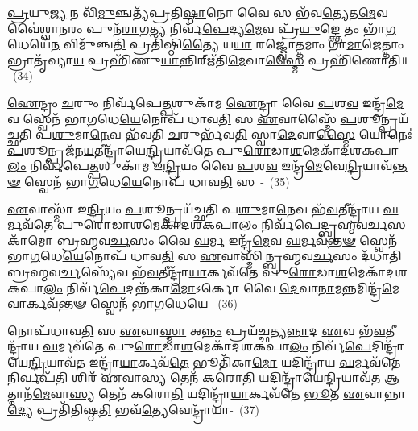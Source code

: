 \-\ul{𑌪𑍍𑌰}\-𑌯𑍁\-\ul{𑌜𑍍𑌯} 𑌨 𑌵𑌿᳴\-\ul{𑌮𑍁}\-𑌞𑍍𑌚𑌤𑍍𑌯᳴𑌪𑍍𑌰𑌤𑌿\-\ul{𑌷𑍍𑌠𑌾}\-𑌨𑍋 𑌵𑍈 𑌸 𑌭᳴𑌵\-\ul{𑌤𑍍𑌯𑍇}\-𑌤\-\ul{𑌮𑍇}\-𑌵 𑌵𑍈॑𑌶𑍍𑌵𑌾\-\ul{𑌨}\-𑌰𑌂 𑌪𑍁𑌨᳴\-\ul{𑌰𑌾}\-𑌗\-\ul{𑌤𑍍𑌯} 𑌨𑌿𑌰𑍍𑌵᳴\-\ul{𑌪𑍇}\-𑌦𑍍𑌯\-\ul{𑌮𑍇}\-𑌵 𑌪𑍍𑌰᳴\-\ul{𑌯𑍁}\-𑌙𑍍𑌕𑍍𑌤𑍇 𑌤𑌂 𑌭𑌾᳴\-\ul{𑌗}\-𑌧𑍇𑌯𑍇᳴\-\ul{𑌨} 𑌵𑌿𑌮𑍁᳴𑌞𑍍𑌚\-\ul{𑌤𑌿} 𑌪𑍍𑌰𑌤𑌿᳴𑌷𑍍𑌠𑌿\-\ul{𑌤𑍍𑌯𑍈} 𑌯\-\ul{𑌯𑌾} 𑌰𑌜𑍍𑌜𑍍𑌵𑍋॑\-\ul{𑌤𑍍𑌤}\-𑌮𑌾𑌂 𑌗𑌾\-\ul{𑌮𑌾}\-𑌜𑍇𑌤𑍍𑌤𑌾𑌂 𑌭𑍍𑌰𑌾𑌤𑍃᳴𑌵𑍍𑌯𑌾\-\ul{𑌯} 𑌪𑍍𑌰𑌹𑌿᳴𑌣𑍁\-\ul{𑌯𑌾}\-𑌨𑍍𑌨𑌿𑌰𑍍\mbox{}𑌋᳴𑌤𑌿\-\ul{𑌮𑍇}\-𑌵𑌾\-\ul{𑌸𑍍𑌮𑍈} 𑌪𑍍𑌰𑌹𑌿᳴𑌣𑍋𑌤𑌿॥~(34)

{\anuvakamend[{\-\ul{𑌨𑌿}\-\-\ul{𑌰𑍍𑌵}\-\-\ul{𑌰𑍁}\-𑌣𑌂 𑌵᳴𑌪𑍇𑌦𑍁\-\ul{𑌭}\-𑌯𑌾\-\ul{𑌦}\-𑌦𑍍𑌯𑍋 𑌵𑍈 𑌸𑌂᳴𑌵\-\ul{𑌥𑍍𑌸}\-𑌰𑍞 𑌷𑌟𑍍𑌤𑍍𑌰𑌿𑍞᳴𑌶𑌚𑍍𑌚।}]}

\-\ul{𑌐}\-𑌨𑍍𑌦𑍍𑌰𑌂 \ul{𑌚}\-𑌰𑍁𑌂 𑌨𑌿𑌰𑍍𑌵᳴𑌪𑍇\-\ul{𑌤𑍍𑌪}\-𑌶𑍁𑌕𑌾᳴𑌮 \ul{𑌐}\-𑌨𑍍𑌦𑍍𑌰𑌾 𑌵𑍈 \ul{𑌪}\-𑌶\-\ul{𑌵} 𑌇𑌨𑍍𑌦𑍍𑌰᳴\-\ul{𑌮𑍇}\-𑌵 𑌸𑍍𑌵𑍇𑌨᳴ 𑌭𑌾\-\ul{𑌗}\-𑌧𑍇\-\ul{𑌯𑍇}\-𑌨𑍋𑌪᳴ 𑌧𑌾𑌵\-\ul{𑌤𑌿} 𑌸 \ul{𑌏}\-𑌵𑌾𑌸𑍍𑌮𑍈᳴ \ul{𑌪}\-𑌶𑍂𑌨𑍍𑌪𑍍𑌰𑌯᳴𑌚𑍍𑌛𑌤𑌿 𑌪\-\ul{𑌶𑍁}\-𑌮𑌾\-\ul{𑌨𑍇}\-𑌵 𑌭᳴𑌵𑌤𑌿 \ul{𑌚}\-𑌰𑍁𑌰𑍍𑌭᳴𑌵\-\ul{𑌤𑌿} 𑌸𑍍𑌵𑌾\-\ul{𑌦𑍇}\-𑌵𑌾\-\ul{𑌸𑍍𑌮𑍈} 𑌯𑍋𑌨𑍇𑌃॑ \ul{𑌪}\-𑌶𑍂𑌨𑍍𑌪𑍍𑌰𑌜᳴𑌨\-\ul{𑌯}\-𑌤𑍀𑌨𑍍𑌦𑍍𑌰𑌾᳴𑌯𑍇\-\ul{𑌨𑍍𑌦𑍍𑌰𑌿}\-𑌯𑌾𑌵᳴𑌤𑍇 𑌪𑍁\-\ul{𑌰𑍋}\-𑌡𑌾\-\ul{𑌶}\-𑌮𑍇𑌕𑌾᳴\-𑌦𑌶\-𑌕𑌪𑌾\-\ul{𑌲𑌂} 𑌨𑌿𑌰𑍍𑌵᳴𑌪𑍇\-\ul{𑌤𑍍𑌪}\-𑌶𑍁𑌕𑌾᳴𑌮 𑌇\-\ul{𑌨𑍍𑌦𑍍𑌰𑌿}\-𑌯𑌂 𑌵𑍈 \ul{𑌪}\-𑌶\-\ul{𑌵} 𑌇𑌨𑍍𑌦𑍍𑌰᳴\-\ul{𑌮𑍇}\-𑌵𑍇\-\ul{𑌨𑍍𑌦𑍍𑌰𑌿}\-𑌯𑌾𑌵᳴\-\ul{𑌨𑍍𑌤}\-\-\ul{𑍟} 𑌸𑍍𑌵𑍇𑌨᳴ 𑌭𑌾\-\ul{𑌗}\-𑌧𑍇\-\ul{𑌯𑍇}\-𑌨𑍋𑌪᳴ 𑌧𑌾𑌵\-\ul{𑌤𑌿} 𑌸~-~(35)

\-\ul{𑌏}\-𑌵𑌾𑌸𑍍𑌮𑌾᳴ 𑌇\-\ul{𑌨𑍍𑌦𑍍𑌰𑌿}\-𑌯𑌂 \ul{𑌪}\-𑌶𑍂𑌨𑍍𑌪𑍍𑌰𑌯᳴𑌚𑍍𑌛𑌤𑌿 𑌪\-\ul{𑌶𑍁}\-𑌮𑌾\-\ul{𑌨𑍇}\-𑌵 𑌭᳴\-\ul{𑌵}\-𑌤𑍀𑌨𑍍𑌦𑍍𑌰𑌾᳴𑌯 \ul{𑌘}\-𑌰𑍍𑌮𑌵᳴𑌤𑍇 𑌪𑍁\-\ul{𑌰𑍋}\-𑌡𑌾\-\ul{𑌶}\-𑌮𑍇𑌕𑌾᳴\-𑌦𑌶\-𑌕𑌪𑌾\-\ul{𑌲𑌂} 𑌨𑌿𑌰𑍍𑌵᳴𑌪𑍇𑌦𑍍𑌬𑍍𑌰𑌹𑍍𑌮𑌵\-\ul{𑌰𑍍𑌚}\-𑌸𑌕𑌾᳴𑌮𑍋 𑌬𑍍𑌰𑌹𑍍𑌮𑌵\-\ul{𑌰𑍍𑌚}\-𑌸𑌂 𑌵𑍈 \ul{𑌘}\-𑌰𑍍𑌮 𑌇𑌨𑍍𑌦𑍍𑌰᳴\-\ul{𑌮𑍇}\-𑌵 \ul{𑌘}\-𑌰𑍍𑌮𑌵᳴\-\ul{𑌨𑍍𑌤}\-\-\ul{𑍟} 𑌸𑍍𑌵𑍇𑌨᳴ 𑌭𑌾\-\ul{𑌗}\-𑌧𑍇\-\ul{𑌯𑍇}\-𑌨𑍋𑌪᳴ 𑌧𑌾𑌵\-\ul{𑌤𑌿} 𑌸 \ul{𑌏}\-𑌵𑌾𑌸𑍍𑌮𑌿᳴𑌨𑍍𑌬𑍍𑌰𑌹𑍍𑌮𑌵\-\ul{𑌰𑍍𑌚}\-𑌸𑌂 𑌦᳴𑌧𑌾𑌤𑌿 𑌬𑍍𑌰𑌹𑍍𑌮𑌵\-\ul{𑌰𑍍𑌚}\-𑌸𑍍𑌯𑍇᳴𑌵 𑌭᳴\-\ul{𑌵}\-𑌤𑍀𑌨𑍍𑌦𑍍𑌰𑌾᳴\-\ul{𑌯𑌾}\-𑌰𑍍𑌕𑌵᳴𑌤𑍇 𑌪𑍁\-\ul{𑌰𑍋}\-𑌡𑌾\-\ul{𑌶}\-𑌮𑍇𑌕𑌾᳴\-𑌦𑌶\-𑌕𑌪𑌾\-\ul{𑌲𑌂} 𑌨𑌿𑌰𑍍𑌵᳴\-\ul{𑌪𑍇}\-𑌦𑌨𑍍𑌨᳴𑌕𑌾\-\ul{𑌮𑍋}\-\-𑌽𑌰𑍍𑌕𑍋 𑌵𑍈 \ul{𑌦𑍇}\-𑌵𑌾\-\ul{𑌨𑌾}\-𑌮\-\ul{𑌨𑍍𑌨}\-𑌮𑌿𑌨𑍍𑌦𑍍𑌰᳴\-\ul{𑌮𑍇}\-𑌵𑌾𑌰𑍍𑌕𑌵᳴\-\ul{𑌨𑍍𑌤}\-\-\ul{𑍟} 𑌸𑍍𑌵𑍇𑌨᳴ 𑌭𑌾\-\ul{𑌗}\-𑌧𑍇\-\ul{𑌯𑍇}\--~(36)

𑌨𑍋𑌪᳴𑌧𑌾𑌵\-\ul{𑌤𑌿} 𑌸 \ul{𑌏}\-𑌵𑌾\-\ul{𑌸𑍍𑌮𑌾} 𑌅\-\ul{𑌨𑍍𑌨𑌂} 𑌪𑍍𑌰𑌯᳴𑌚𑍍𑌛𑌤𑍍𑌯\-\ul{𑌨𑍍𑌨𑌾}\-𑌦 \ul{𑌏}\-𑌵 𑌭᳴\-\ul{𑌵}\-𑌤𑍀𑌨𑍍𑌦𑍍𑌰𑌾᳴𑌯 \ul{𑌘}\-𑌰𑍍𑌮𑌵᳴𑌤𑍇 𑌪𑍁\-\ul{𑌰𑍋}\-𑌡𑌾\-\ul{𑌶}\-𑌮𑍇𑌕𑌾᳴\-𑌦𑌶\-𑌕𑌪𑌾\-\ul{𑌲𑌂} 𑌨𑌿𑌰𑍍𑌵᳴\-\ul{𑌪𑍇}\-𑌦𑌿𑌨𑍍𑌦𑍍𑌰𑌾᳴𑌯𑍇\-\ul{𑌨𑍍𑌦𑍍𑌰𑌿}\-𑌯𑌾𑌵᳴\-\ul{𑌤} 𑌇𑌨𑍍𑌦𑍍𑌰𑌾᳴\-\ul{𑌯𑌾}\-𑌰𑍍𑌕𑌵᳴\-\ul{𑌤𑍇} 𑌭𑍂𑌤𑌿᳴𑌕𑌾\-\ul{𑌮𑍋} 𑌯𑌦𑌿𑌨𑍍𑌦𑍍𑌰𑌾᳴𑌯 \ul{𑌘}\-𑌰𑍍𑌮𑌵᳴𑌤𑍇 \ul{𑌨𑌿}\-𑌰𑍍𑌵𑌪᳴\-\ul{𑌤𑌿} 𑌶𑌿𑌰᳴ \ul{𑌏}\-𑌵𑌾\-\ul{𑌸𑍍𑌯} 𑌤𑍇𑌨᳴ 𑌕𑌰𑍋\-\ul{𑌤𑌿} 𑌯𑌦𑌿𑌨𑍍𑌦𑍍𑌰𑌾᳴𑌯𑍇\-\ul{𑌨𑍍𑌦𑍍𑌰𑌿}\-𑌯𑌾𑌵᳴𑌤 \ul{𑌆}\-𑌤𑍍𑌮𑌾𑌨᳴\-\ul{𑌮𑍇}\-𑌵𑌾\-\ul{𑌸𑍍𑌯} 𑌤𑍇𑌨᳴ 𑌕𑌰𑍋\-\ul{𑌤𑌿} 𑌯𑌦𑌿𑌨𑍍𑌦𑍍𑌰𑌾᳴\-\ul{𑌯𑌾}\-𑌰𑍍𑌕𑌵᳴𑌤𑍇 \ul{𑌭𑍂}\-𑌤 \ul{𑌏}\-𑌵𑌾𑌨𑍍𑌨𑌾\-\ul{𑌦𑍍𑌯𑍇} 𑌪𑍍𑌰𑌤𑌿᳴𑌤𑌿𑌷𑍍𑌠\-\ul{𑌤𑌿} 𑌭𑌵᳴\-\ul{𑌤𑍍𑌯𑍇}\-𑌵𑍇𑌨𑍍𑌦𑍍𑌰𑌾᳴𑌯𑌾-~(37)

